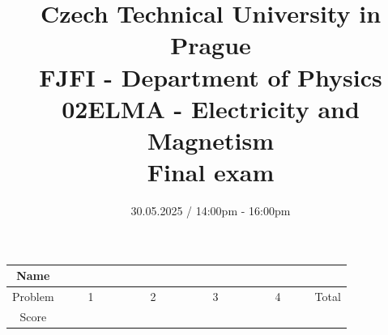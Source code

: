 \documentclass[a4paper,12pt]{article}
\title{{\large Czech Technical University in Prague} \\
    {\Large FJFI - Department of Physics} \\ 
                  02ELMA - Electricity and Magnetism \\ 
          {\Large \textbf{Final exam}}\vspace{-1cm}}
\date{30.05.2025 / 14:00pm - 16:00pm}
\author{}
\begin{document}
\maketitle
\vspace{-1.5em}

\begin{center}
    \renewcommand{\arraystretch}{2}
    \begin{tabular}{ |c|c|c|c|c|c| } 
        \hline
        Name& \multicolumn{5}{c|}{\phantom{~~~~~~~~~~~~~~~~~~~~~~~~~~~~~~~~~~~~~~~~~~~~~~~~~~~~~~~~~~~~~~~~~~~~~~~~~~~~~~~~~}}\\
        \hline
        Problem & ~~~~1~~~~ & ~~~~2~~~~ & ~~~~3~~~~ & ~~~~4~~~~ & Total \\ 
        \hline
        Score & &  & & & \\
        \hline
    \end{tabular}
\end{center}

\vspace*{1cm}







\end{document}

